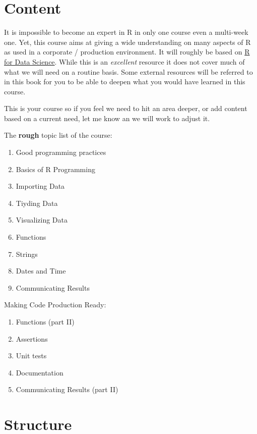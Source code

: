 \documentclass[]{book}
\providecommand{\tightlist}{%
  \setlength{\itemsep}{0pt}\setlength{\parskip}{0pt}}
\theoremstyle{definition}
\theoremstyle{definition}
\theoremstyle{definition}
\theoremstyle{remark}
\begin{document}
\section{Content}\label{content}

It is impossible to become an expert in R in only one course even a
multi-week one. Yet, this course aims at giving a wide understanding on
many aspects of R as used in a corporate / production environment. It
will roughly be based on \href{http://r4ds.had.co.nz}{R for Data
Science}. While this is an \emph{excellent} resource it does not cover
much of what we will need on a routine basis. Some external resources
will be referred to in this book for you to be able to deepen what you
would have learned in this course.

This is your course so if you feel we need to hit an area deeper, or add
content based on a current need, let me know an we will work to adjust
it.

The \textbf{rough} topic list of the course:

\begin{enumerate}
\def\labelenumi{\arabic{enumi}.}
\tightlist
\item
  Good programming practices
\item
  Basics of R Programming
\item
  Importing Data
\item
  Tiyding Data
\item
  Visualizing Data
\item
  Functions
\item
  Strings
\item
  Dates and Time
\item
  Communicating Results
\end{enumerate}

Making Code Production Ready:

\begin{enumerate}
\def\labelenumi{\arabic{enumi}.}
\setcounter{enumi}{9}
\tightlist
\item
  Functions (part II)
\item
  Assertions
\item
  Unit tests
\item
  Documentation
\item
  Communicating Results (part II)
\end{enumerate}

\section{Structure}\label{structure}
\end{document}
